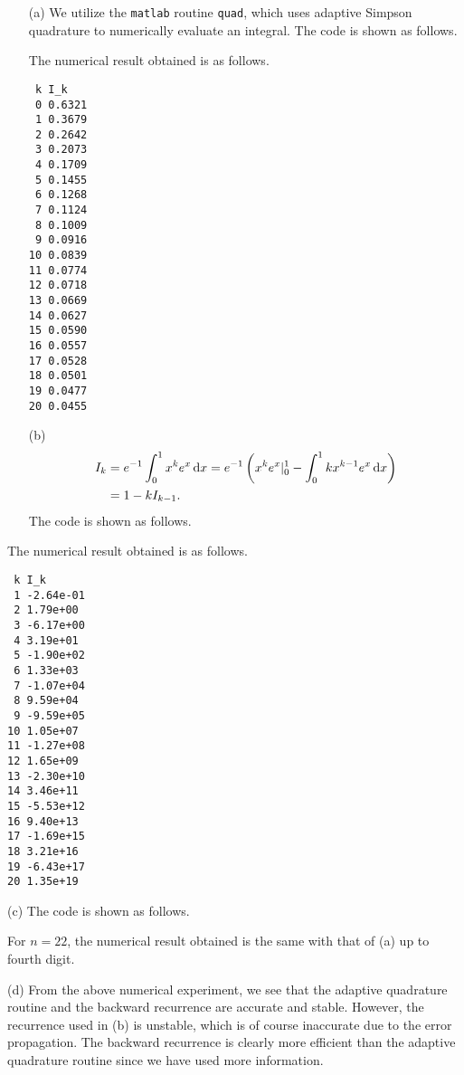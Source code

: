 \begin{multicols}{2}
  \setlength{\columnseprule}{0.2pt}
  \begin{sol}
    \begin{itemize}
    \item[(a)]
      We utilize the \verb|matlab| routine \verb|quad|,
      which uses adaptive Simpson quadrature to numerically evaluate an integral.
      The code is shown as follows.
      
      
      The numerical result obtained is as follows.
\begin{verbatim}
 k I_k
 0 0.6321
 1 0.3679
 2 0.2642
 3 0.2073
 4 0.1709
 5 0.1455
 6 0.1268
 7 0.1124
 8 0.1009
 9 0.0916
10 0.0839
11 0.0774
12 0.0718
13 0.0669
14 0.0627
15 0.0590
16 0.0557
17 0.0528
18 0.0501
19 0.0477
20 0.0455
\end{verbatim}

    \item[(b)]
      \begin{align*}
        I_k &= e^{-1}\int_0^1x^ke^x\,\mathrm{d} x = e^{-1}\left( x^ke^x|_0^1 - \int_0^1kx^{k-1}e^x\,\mathrm{d} x\right) \\
        &= 1 - kI_{k-1}.
      \end{align*}
      The code is shown as follows.
      
    \end{itemize}
    The numerical result obtained is as follows.
\begin{verbatim}
 k I_k
 1 -2.64e-01
 2 1.79e+00
 3 -6.17e+00
 4 3.19e+01
 5 -1.90e+02
 6 1.33e+03
 7 -1.07e+04
 8 9.59e+04
 9 -9.59e+05
10 1.05e+07
11 -1.27e+08
12 1.65e+09
13 -2.30e+10
14 3.46e+11
15 -5.53e+12
16 9.40e+13
17 -1.69e+15
18 3.21e+16
19 -6.43e+17
20 1.35e+19
\end{verbatim}

  \item[(c)]
    The code is shown as follows.
    
    For $n=22$,
    the numerical result obtained is the same with that of (a)
    up to fourth digit.

  \item[(d)]
    From the above numerical experiment,
    we see that the adaptive quadrature routine and the backward recurrence are accurate and stable.
    However, the recurrence used in (b) is unstable,
    which is of course inaccurate due to the error propagation.
    The backward recurrence is clearly more efficient than the adaptive quadrature
    routine since we have used more information.


\end{sol}
\end{multicols}
